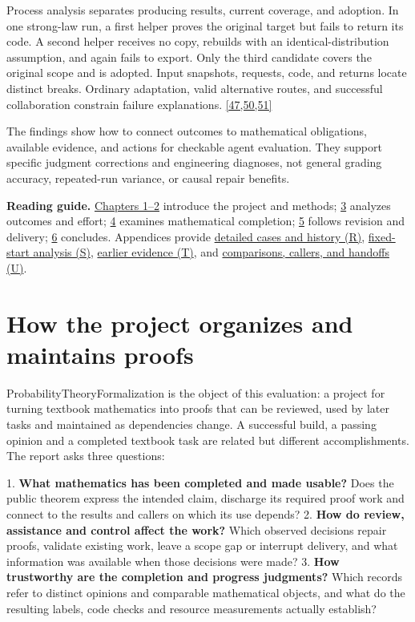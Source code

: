 Process analysis separates producing results, current coverage, and adoption. In one strong-law run, a first helper proves the original target but fails to return its code. A second helper receives no copy, rebuilds with an identical-distribution assumption, and again fails to export. Only the third candidate covers the original scope and is adopted. Input snapshots, requests, code, and returns locate distinct breaks. Ordinary adaptation, valid alternative routes, and successful collaboration constrain failure explanations. \hyperlink{ref-47}{\mbox{[47,50,51]}}

The findings show how to connect outcomes to mathematical obligations, available evidence, and actions for checkable agent evaluation. They support specific judgment corrections and engineering diagnoses, not general grading accuracy, repeated-run variance, or causal repair benefits.

\textbf{Reading guide.} \hyperlink{section-1}{Chapters 1–2} introduce the project and methods; \hyperlink{section-3}{3} analyzes outcomes and effort; \hyperlink{section-4}{4} examines mathematical completion; \hyperlink{section-5}{5} follows revision and delivery; \hyperlink{section-6}{6} concludes. Appendices provide \href{en-appendix.pdf\#appendix-r}{detailed cases and history (R)}, \href{en-appendix.pdf\#appendix-s}{fixed-start analysis (S)}, \href{en-appendix.pdf\#appendix-t}{earlier evidence (T)}, and \href{en-appendix.pdf\#appendix-u}{comparisons, callers, and handoffs (U)}.

\section[How the project organizes and maintains proofs]{\texorpdfstring{\protect\hypertarget{section-1}{}How the project organizes and maintains proofs}{How the project organizes and maintains proofs}}
\hypertarget{evaluation-questions}{}

ProbabilityTheoryFormalization is the object of this evaluation: a project for turning textbook mathematics into proofs that can be reviewed, used by later tasks and maintained as dependencies change. A successful build, a passing opinion and a completed textbook task are related but different accomplishments. The report asks three questions:

1. \textbf{What mathematics has been completed and made usable?} Does the public theorem express the intended claim, discharge its required proof work and connect to the results and callers on which its use depends? 2. \textbf{How do review, assistance and control affect the work?} Which observed decisions repair proofs, validate existing work, leave a scope gap or interrupt delivery, and what information was available when those decisions were made? 3. \textbf{How trustworthy are the completion and progress judgments?} Which records refer to distinct opinions and comparable mathematical objects, and what do the resulting labels, code checks and resource measurements actually establish?

